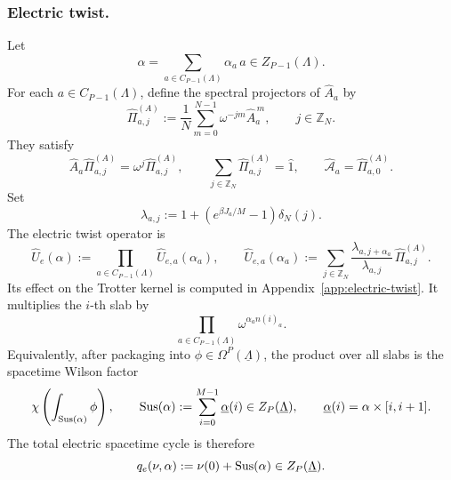 \subsubsection{Electric twist.}
Let
\begin{equation}
\alpha=\sum_{a\in C_{P-1}(\Lambda)}\alpha_a\,a
\in Z_{P-1}(\Lambda).
\end{equation}
For each \(a\in C_{P-1}(\Lambda)\), define the spectral projectors of \(\hat A_a\) by
\begin{equation}
	\hat\Pi_{a,j}^{(A)}
	:=
	\frac1N\sum_{m=0}^{N-1}\omega^{-jm}\hat A_a^{\,m},
	\qquad
	j\in\mathbb Z_N.
\end{equation}
They satisfy
\begin{equation}
\hat A_a\hat\Pi_{a,j}^{(A)}
=
\omega^j\hat\Pi_{a,j}^{(A)},
\qquad
\sum_{j\in\mathbb Z_N}\hat\Pi_{a,j}^{(A)}=\hat 1,
\qquad
\hat{\mathcal A}_a=\hat\Pi_{a,0}^{(A)}.
\label{eq:Aproj-relations}
\end{equation}
Set
\begin{equation}
	\lambda_{a,j}
	:=
	1+\left(e^{\beta J_a/M}-1\right)\delta_N(j).
\end{equation}
The electric twist operator is
\begin{equation}
	\hat U_e(\alpha)
	:=
	\prod_{a\in C_{P-1}(\Lambda)}\hat U_{e,a}(\alpha_a),
	\qquad
	\hat U_{e,a}(\alpha_a)
	:=
	\sum_{j\in\mathbb Z_N}
	\frac{\lambda_{a,j+\alpha_a}}{\lambda_{a,j}}\,
	\hat\Pi_{a,j}^{(A)} .
	\label{eq:electric-twist-operator}
\end{equation}
Its effect on the Trotter kernel is computed in Appendix~\ref{app:electric-twist}. It
multiplies the \(i\)-th slab by
\begin{equation}
\prod_{a\in C_{P-1}(\Lambda)}\omega^{\alpha_a n(i)_a}.
\end{equation}
Equivalently, after packaging into \(\phi\in\Omega^P(\underline\Lambda)\), the product over
all slabs is the spacetime Wilson factor
\begin{equation}
	\chi\left(\int_{\operatorname{Sus}(\alpha)}\phi\right),
	\qquad
	\operatorname{Sus}(\alpha)
	:=
	\sum_{i=0}^{M-1}\underline\alpha(i)\in Z_P(\underline\Lambda),
	\qquad
	\underline\alpha(i)=\alpha\times[i,i+1].
	\label{eq:electric-suspension}
\end{equation}
The total electric spacetime cycle is therefore
\begin{equation}
	q_e(\nu,\alpha)
	:=
	\nu(0)+\operatorname{Sus}(\alpha)
	\in Z_P(\underline\Lambda).
	\label{eq:qe}
\end{equation}

